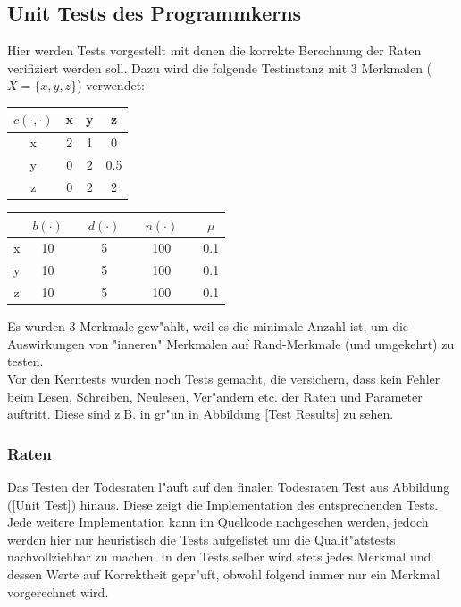 \documentclass[11pt, a4paper, german]{article}
\theoremstyle{plain}
\begin{document}
	\subsection{Unit Tests des Programmkerns}
	Hier werden Tests vorgestellt mit denen die korrekte Berechnung der Raten verifiziert werden soll. Dazu wird die folgende Testinstanz mit 3 Merkmalen ($ X = \{x,y,z\} $) verwendet:\\
	\begin{center}
		\begin{minipage}{0.35 \textwidth}
			\begin{tabular}{ c | c c c }
			 $ c(\cdot, \cdot) $ & x & y & z \\
			 \hline
			 x & 2 & 1 & 0 \\
			 y & 0 & 2 & 0.5 \\
			 z & 0 & 2 & 2 \\
			\end{tabular}
			\end{minipage}
			\begin{minipage}{0.5 \textwidth}
			\begin{tabular}{ c | c  c  c  c  c  c  c }
			 & $ b(\cdot ) $ &  & $ d(\cdot ) $ & & $ n(\cdot ) $ & & $ \mu $\\
			 \hline
			 x & 10 &  & 5 & & 100 & & 0.1\\
			 y & 10 &  & 5 & & 100 & & 0.1\\   
			 z & 10 &  & 5 & & 100 & & 0.1\\
			\end{tabular}
			\end{minipage}
	\end{center}
	Es wurden 3 Merkmale gew"ahlt, weil es die minimale Anzahl ist, um die Auswirkungen von "{}inneren"{} Merkmalen auf Rand-Merkmale (und umgekehrt) zu testen.\\
	Vor den Kerntests wurden noch Tests gemacht, die versichern, dass kein Fehler beim Lesen, Schreiben, Neulesen, Ver"andern etc. der Raten und Parameter auftritt. Diese sind z.B. in gr"un in Abbildung \ref{Test Results} zu sehen.

	\subsubsection{Raten}
	Das Testen der Todesraten l"auft auf den finalen Todesraten Test aus Abbildung (\ref{Unit Test}) hinaus. Diese zeigt die Implementation des entsprechenden Tests. Jede weitere Implementation kann im Quellcode nachgesehen werden, jedoch werden hier nur heuristisch die Tests aufgelistet um die Qualit"atstests nachvollziehbar zu machen. In den Tests selber wird stets jedes Merkmal und dessen Werte auf Korrektheit gepr"uft, obwohl folgend immer nur ein Merkmal vorgerechnet wird.\\
	
\end{document}
